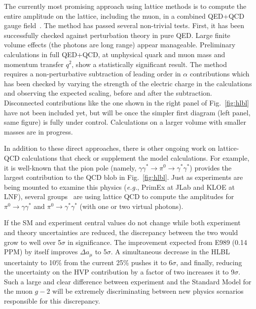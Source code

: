 The currently most promising approach using lattice methods is to compute the entire amplitude on the lattice, including the muon, in a  combined QED+QCD gauge field~\cite{hep-lat/9602005,hep-lat/0509016,827504}. The method has passed several non-trivial tests. First, it has been successfully checked against perturbation theory in pure QED. Large finite volume effects (the photons are long range) appear manageable. Preliminary calculations in full QED+QCD, at unphysical quark and muon mass and momentum transfer $q^2$, show a statistically significant result. The method requires a non-perturbative subtraction of leading order in $\alpha$ contributions which has been checked by varying the strength of the electric charge in the calculations and observing the expected scaling, before and after the subtraction. Disconnected contributions like the one shown in the right panel of Fig.~\ref{fig:hlbl} have not been included yet, but will be once the simpler first diagram (left panel, same figure) is fully under control. Calculations on a larger volume with smaller masses are in progress.

In addition to these direct approaches, there is other ongoing work on lattice-QCD calculations that check or
supplement the model calculations.
For example, it is well-known that the pion pole (namely, $\gamma\gamma^*\to\pi^0\to\gamma^*\gamma^*$)
provides the largest contribution to the QCD blob in Fig.~\ref{fig:hlbl}.
Just as experiments are being mounted to examine this physics (\emph{e.g.}, PrimEx at JLab and KLOE at LNF),
several groups~\cite{arXiv:0810.5550,arXiv:0912.0253,XFeng} are using lattice QCD to compute the amplitudes for
$\pi^0\to\gamma\gamma^*$ and $\pi^0\to\gamma^*\gamma^*$ (with one or two virtual photons).

If the SM and experiment central values do not change while both experiment and theory uncertainties are reduced, the discrepancy between the two would grow to well over 5$\sigma$ in significance. The improvement expected from E989 (0.14 PPM) by itself improves $\Delta a_\mu$ to 5$\sigma$. A simultaneous decrease in the HLBL uncertainty to 10\% from the current 25\% pushes it to 6$\sigma$, and finally, reducing the uncertainty on the HVP contribution by a factor of two increases it to 9$\sigma$. Such a large and clear difference between experiment and the Standard Model for the muon $g-2$ will be extremely  discriminating between new physics scenarios responsible for this discrepancy.




